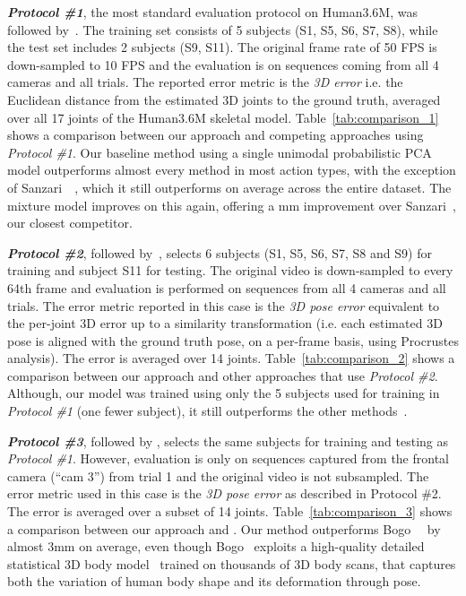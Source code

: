 \documentclass[10pt,twocolumn,letterpaper]{article}
\begin{document}
\textit{{\bf Protocol \#1}}, the most standard evaluation protocol on Human3.6M,
was followed by~\cite{ionescu2014human3, li2015maximum, tekin2015predicting,
  tekin2016structured, tekin2016fusing, zhou2015sparseness,
  sanzari2016bayesian}. The training set consists of 5 subjects (S1, S5, S6, S7,
S8), while the test set includes 2 subjects (S9, S11). The original frame rate
of 50 FPS is down-sampled to 10 FPS and the evaluation is on sequences coming
from all 4 cameras and all trials. The reported error metric is the \emph{3D
  error} i.e. the Euclidean distance from the estimated 3D joints to the ground
truth, averaged over all 17 joints of the Human3.6M skeletal model.
Table~\ref{tab:comparison_1} shows a comparison between our approach and
competing approaches using \textit{Protocol \#1}.
Our baseline method using a single unimodal probabilistic PCA model outperforms
almost every method in most action types, with the exception of
Sanzari~\etal~\cite{sanzari2016bayesian}, which it still outperforms on average
across the entire dataset. The mixture model improves on this again, offering a
mm improvement over Sanzari~\etal, our closest competitor.

\textit{{\bf Protocol \#2}}, followed
by~\cite{Yasin:etal:CVPR:2016,rogez2016mocap}, selects 6 subjects (S1, S5, S6,
S7, S8 and S9) for training and subject S11 for testing. The original video is
down-sampled to every 64th frame and evaluation is performed on sequences from
all 4 cameras and all trials. The error metric reported in this case is
the \emph{3D pose error} equivalent to the per-joint 3D error up to a similarity
transformation (i.e. each estimated 3D pose is aligned with the ground truth
pose, on a per-frame basis, using Procrustes analysis). The error is averaged
over 14 joints.  Table~\ref{tab:comparison_2} shows a comparison between our
approach and other approaches that use \textit{Protocol \#2}. Although, our
model was trained using only the 5 subjects used for training in \emph{Protocol
  \#1} (one fewer subject), it still outperforms the other
methods~\cite{rogez2016mocap,Yasin:etal:CVPR:2016}.

\textit{{\bf Protocol \#3}}, followed by \cite{bogo2016keep}, selects the same
subjects for training and testing as \emph{Protocol \#1}. However, evaluation is
only on sequences captured from the frontal camera (``cam 3'') from trial 1 and
the original video is not subsampled. The error metric used in this case is the \emph{3D
  pose error} as described in Protocol \#2. The error is averaged over a subset
of 14 joints. Table~\ref{tab:comparison_3} shows a comparison between our
approach and \cite{bogo2016keep}. Our method outperforms
Bogo~\etal~\cite{bogo2016keep} by almost 3mm on average, even though Bogo~\etal
exploits a high-quality detailed statistical 3D body model~\cite{loper2015smpl}
trained on thousands of 3D body scans, that captures both the variation of human
body shape and its deformation through pose.
\end{document}
